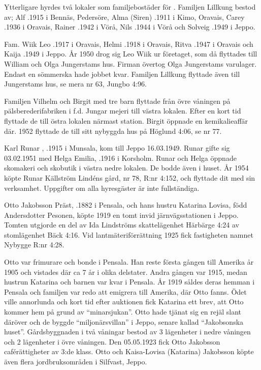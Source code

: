 Ytterligare hyrdes två lokaler som familjebostäder för . Familjen Lillkung bestod av; Alf 	 .1915 i Bennäs, Pedersöre,	Alma (Siren) .1911 i Kimo, Oravais,	Carey .1936 i Oravais, Rainer	.1942 i Vörå, Nils	.1944 i Vörå	och	Solveig	.1949 i Jeppo.

Fam. Wiik	Leo	.1917 i Oravais,	Helmi	.1918 i Oravais,	Ritva	.1947 i Oravais och Kaija .1949 i Jeppo. År 1950 drog sig Leo Wiik ur företaget, som då flyttades till William och Olga Jungerstams hus. Firman övertog Olga Jungerstams varulager. Endast en sömmerska hade jobbet kvar. Familjen Lillkung flyttade även till Jungerstams hus, se mera nr 63, Jungbo 4:96.

Familjen Vilhelm och Birgit  med tre barn flyttade från övre våningen på pälsberederifabriken i f.d. Jungar mejeri till västra lokalen. Efter en kort tid flyttade de till östra lokalen närmast station. Birgit öppnade en kemikalieaffär där. 1952 flyttade de till sitt nybyggda hus på Höglund 4:06, se nr 77.

Karl Runar , .1915 i Munsala, kom till Jeppo 16.03.1949. Runar gifte sig 03.02.1951 med Helga Emilia, .1916 i Korsholm. Runar och Helga öppnade skomakeri och skobutik i västra nedre lokalen. De bodde även i huset. År 1954 köpte Runar Källström Lindéns gård, nr 78, R:nr 4:152, och flyttade dit med sin verksamhet.
Uppgifter om alla hyresgäster är inte fullständiga.


Otto Jakobsson Präst, .1882 i Pensala, och hans hustru Katarina Lovisa, född Andersdotter Pesonen, köpte 1919 en tomt invid järnvägsstationen i Jeppo. Tomten utgjorde en del av Ida Lindströms skattelägenhet Härbärge 4:24 av stomlägenhet Bäck 4:16. Vid lantmäteriförrättning 1925 fick fastigheten namnet Nybygge R:nr 4:28.

Otto var frimurare och bonde i Pensala. Han reste första gången till Amerika år 1905 och vistades där ca 7 år i olika delstater. Andra gången var 1915, medan hustrun Katarina och barnen var kvar i Pensala. År 1919 såldes deras hemman i Pensala och familjen var redo att emigrera till Amerika, där Otto fanns. Ödet ville annorlunda och kort tid efter auktionen fick Katarina ett brev, att Otto kommer hem på grund av ``minarsjukan''. Otto hade tjänat sig en rejäl slant däröver och de byggde ``miljonärsvillan'' i Jeppo, senare kallad ``Jakobsonska huset''.  Gårdsbyggnaden i två våningar  bestod av 3 lägenheter i nedre våningen och 2 lägenheter i övre våningen. Den 05.05.1923 fick Otto Jakobsson caférättigheter av 3:de klass. Otto och Kaisa-Lovisa (Katarina) Jakobsson köpte även flera jordbruksområden i Silfvast, Jeppo.

